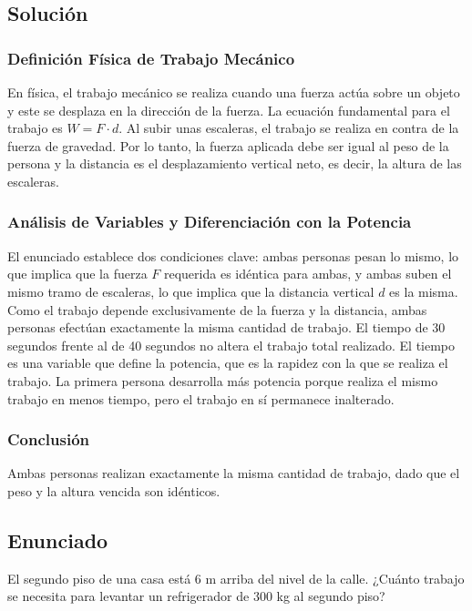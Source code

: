 \documentclass[12pt,a4paper]{article}
\begin{document}
\subsection*{Solución}

\subsubsection*{Definición Física de Trabajo Mecánico}
En física, el trabajo mecánico se realiza cuando una fuerza actúa sobre un objeto y este se desplaza en la dirección de la fuerza. La ecuación fundamental para el trabajo es $W = F \cdot d$. Al subir unas escaleras, el trabajo se realiza en contra de la fuerza de gravedad. Por lo tanto, la fuerza aplicada debe ser igual al peso de la persona y la distancia es el desplazamiento vertical neto, es decir, la altura de las escaleras.

\subsubsection*{Análisis de Variables y Diferenciación con la Potencia}
El enunciado establece dos condiciones clave: ambas personas pesan lo mismo, lo que implica que la fuerza $F$ requerida es idéntica para ambas, y ambas suben el mismo tramo de escaleras, lo que implica que la distancia vertical $d$ es la misma. Como el trabajo depende exclusivamente de la fuerza y la distancia, ambas personas efectúan exactamente la misma cantidad de trabajo. El tiempo de 30 segundos frente al de 40 segundos no altera el trabajo total realizado. El tiempo es una variable que define la potencia, que es la rapidez con la que se realiza el trabajo. La primera persona desarrolla más potencia porque realiza el mismo trabajo en menos tiempo, pero el trabajo en sí permanece inalterado.

\subsubsection*{Conclusión}
Ambas personas realizan exactamente la misma cantidad de trabajo, dado que el peso y la altura vencida son idénticos.

\newpage
\subsection*{Enunciado}
El segundo piso de una casa está 6 m arriba del nivel de la calle. ¿Cuánto trabajo se necesita para levantar un refrigerador de 300 kg al segundo piso?
\end{document}
